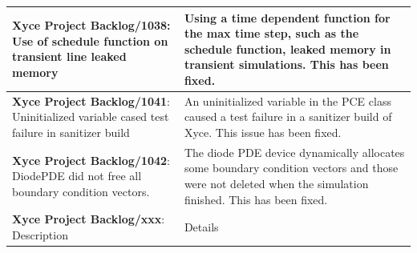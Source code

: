 {\begin{longtable}[h] {>{\raggedright\small}m{2in}|>{\raggedright\let\\\tabularnewline\small}m{3.5in}}
\textbf{Xyce Project Backlog/1038}: Use of schedule function on transient line leaked memory
  &  Using a time dependent function for the max time step, such as the schedule function,
  leaked memory in transient simulations.  This has been fixed.
  \\\hline

\textbf{Xyce Project Backlog/1041}: Uninitialized variable cased test failure in sanitizer build
  &  An uninitialized variable in the PCE class caused a test failure in a sanitizer build of Xyce.  
  This issue has been fixed.
  \\\hline
  
\textbf{Xyce Project Backlog/1042}: DiodePDE did not free all boundary condition vectors.
  &  The diode PDE device dynamically allocates some boundary condition vectors and those
  were not deleted when the simulation finished.  This has been fixed.
  \\\hline
   
\textbf{Xyce Project Backlog/xxx}: Description
  &  Details
  \\\hline


\end{longtable}
}
